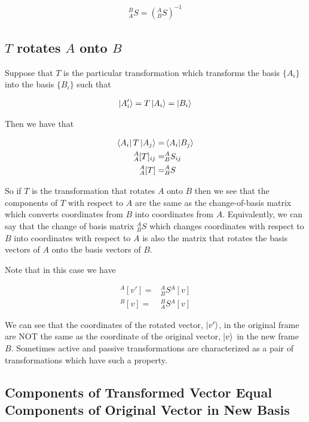 \documentclass[12pt]{article}
\begin{document}
\begin{align}
{^B_A S} = \left({^A_B S}\right)^{-1}
\end{align}

\subsection{$T$ rotates $A$ onto $B$}

Suppose that $T$ is the particular transformation which transforms the basis $\{A_i\}$ into the basis $\{B_i\}$ such that

\begin{align}
\ket{A'_i} = T\ket{A_i} = \ket{B_i}
\end{align}

Then we have that

\begin{align}
\bra{A_i} T \ket{A_j} =& \braket{A_i | B_j}\\
{^A_A[T]_{ij}} =& {^A_B S_{ij}}\\
{^A_A[T]} =& {^A_B S}
\end{align}

So if $T$ is the transformation that rotates $A$ onto $B$ then we see that the components of $T$ with respect to $A$ are the same as the change-of-basis matrix which converts coordinates from $B$ into coordinates from $A$.
Equivalently, we can say that the change of basis matrix ${^A_B S}$ which changes coordinates with respect to $B$ into coordinates with respect to $A$ is also the matrix that rotates the basis vectors of $A$ onto the basis vectors of $B$.

Note that in this case we have

\begin{align}
{^A[v']} =& {^A_B S}{^A[v]}\\
{^B[v]} =& {^B_A S}{^A[v]}
\end{align}

We can see that the coordinates of the rotated vector, $\ket{v'}$, in the original frame are NOT the same as the coordinate of the original vector, $\ket{v}$ in the new frame $B$.
Sometimes active and passive transformations are characterized as a pair of transformations which have such a property.

\subsection{Components of Transformed Vector Equal Components of Original Vector in New Basis}
\end{document}
